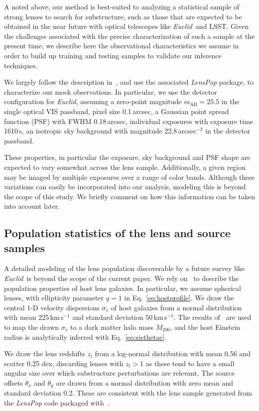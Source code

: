 \documentclass[twocolumn]{aastex62}
\newcommand{\package}[1]{\textsl{#1}}
\newcommand{\Euclid}{\textsl{Euclid}}
\newcommand{\Mtwo}{M_{200}}
\begin{document}
A noted above, our method is best-suited to analyzing a statistical sample of strong lenses to search for substructure, such as those that are expected to be obtained in the near future with optical telescopes like \Euclid~and LSST. Given the challenges associated with the precise characterization of such a sample at the present time, we describe here the observational characteristics we assume in order to build up training and testing samples to validate our inference techniques.

We largely follow the description in~\citet{2015ApJ...811...20C}, and use the associated \package{LensPop} package, to characterize our mock observations. In particular, we use the detector configuration for \Euclid, assuming a zero-point magnitude $m_\mathrm{AB} = 25.5$ in the single optical VIS passband, pixel size 0.1\,arcsec, a Gaussian point spread function (PSF) with FWHM 0.18\,arcsec, individual exposures with exposure time 1610\,s, an isotropic sky background with magnitude 22.8\,arcsec$^{-2}$ in the detector passband.

These properties, in particular the exposure, sky background and PSF shape are expected to vary somewhat across the lens sample. Additionally, a given region may be imaged by multiple exposures over a range of color bands. Although these variations can easily be incorporated into our analysis, modeling this is beyond the scope of this study. We briefly comment on how this information can be taken into account later.

\subsection{Population statistics of the lens and source samples}
\label{sec:populations}

A detailed modeling of the lens population discoverable by a future survey like \Euclid~is beyond the scope of the current paper. We rely on~\citet{2015ApJ...811...20C} to describe the population properties of host lens galaxies. In particular, we assume spherical lenses, with ellipticity parameter $q=1$ in Eq.~\ref{eq:hostprofile}. We draw the central 1-D velocity dispersions $\sigma_v$ of host galaxies from a normal distribution with mean 225\,km\,s$^{-1}$ and standard deviation 50\,km\,s$^{-1}$. The results of~\citet{2018ApJ...859...96Z} are used to map the drawn $\sigma_v$ to a dark matter halo mass $\Mtwo$, and the host Einstein radius is analytically inferred with Eq.~\ref{eq:siethetae}.


We draw the lens redshifts $z_l$ from a log-normal distribution with mean 0.56 and scatter 0.25 dex, discarding lenses with $z_l > 1$ as these tend to have a small angular size over which substructure perturbations are relevant. The source offsets $\theta_x$ and $\theta_y$ are drawn from a normal distribution with zero mean and standard deviation 0.2. These are consistent with the lens sample generated from the \package{LensPop} code packaged with~\citet{2015ApJ...811...20C}.
\end{document}
